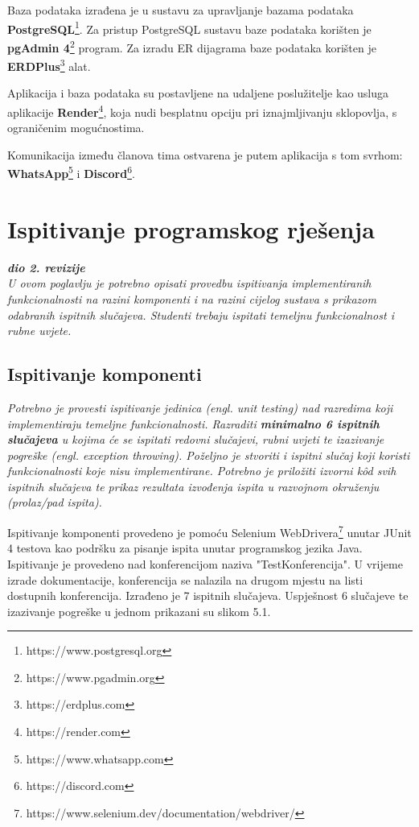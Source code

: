 			Baza podataka izrađena je u sustavu za upravljanje bazama podataka \textbf{PostgreSQL}\footnote{https://www.postgresql.org}. Za pristup PostgreSQL sustavu baze podataka korišten je \textbf{pgAdmin 4}\footnote{https://www.pgadmin.org} program. Za izradu ER dijagrama baze podataka korišten je \textbf{ERDPlus}\footnote{https://erdplus.com} alat.
			
			Aplikacija i baza podataka su postavljene na udaljene poslužitelje kao usluga aplikacije \textbf{Render}\footnote{https://render.com}, koja nudi besplatnu opciju pri iznajmljivanju sklopovlja, s ograničenim mogućnostima.
			
			Komunikacija između članova tima ostvarena je putem aplikacija s tom svrhom: \textbf{WhatsApp}\footnote{https://www.whatsapp.com} i \textbf{Discord}\footnote{https://discord.com}.
			
			\eject 
		
	
		\section{Ispitivanje programskog rješenja}
			
			\textbf{\textit{dio 2. revizije}}\\
			
			 \textit{U ovom poglavlju je potrebno opisati provedbu ispitivanja implementiranih funkcionalnosti na razini komponenti i na razini cijelog sustava s prikazom odabranih ispitnih slučajeva. Studenti trebaju ispitati temeljnu funkcionalnost i rubne uvjete.}
			 
			
			\subsection{Ispitivanje komponenti}
			\textit{Potrebno je provesti ispitivanje jedinica (engl. unit testing) nad razredima koji implementiraju temeljne funkcionalnosti. Razraditi \textbf{minimalno 6 ispitnih slučajeva} u kojima će se ispitati redovni slučajevi, rubni uvjeti te izazivanje pogreške (engl. exception throwing). Poželjno je stvoriti i ispitni slučaj koji koristi funkcionalnosti koje nisu implementirane. Potrebno je priložiti izvorni kôd svih ispitnih slučajeva te prikaz rezultata izvođenja ispita u razvojnom okruženju (prolaz/pad ispita). }
			
			Ispitivanje komponenti provedeno je pomoću Selenium WebDrivera\footnote{https://www.selenium.dev/documentation/webdriver/} unutar JUnit 4 testova kao podršku za pisanje ispita unutar programskog jezika Java. Ispitivanje je provedeno nad konferencijom naziva "TestKonferencija". U vrijeme izrade dokumentacije, konferencija se nalazila na drugom mjestu na listi dostupnih konferencija. 
			Izrađeno je 7 ispitnih slučajeva. Uspješnost 6 slučajeve te izazivanje pogreške u jednom prikazani su slikom 5.1.
			
